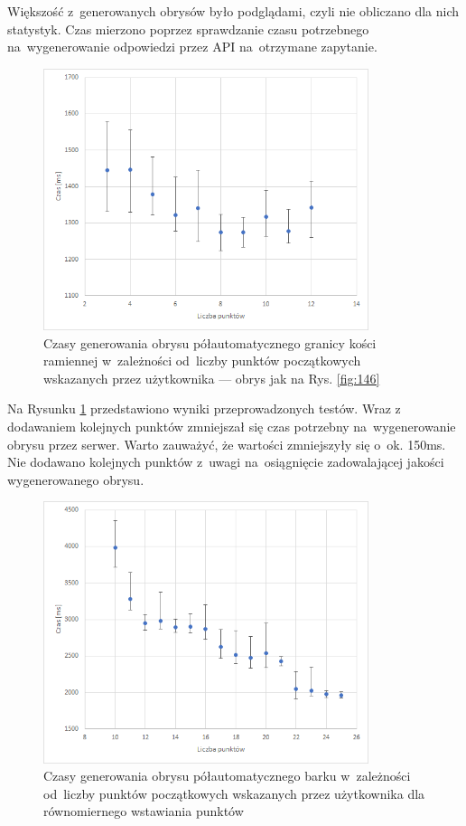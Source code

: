 \documentclass[a4paper,11pt,twoside,openright]{report}
\theoremstyle{definition}
\begin{document}
Większość z~generowanych obrysów było podglądami, czyli nie obliczano dla nich
statystyk. Czas mierzono poprzez sprawdzanie czasu potrzebnego na~wygenerowanie
odpowiedzi przez API na~otrzymane zapytanie.

\begin{figure}[h!]
	\center
	\includegraphics[width=0.85\textwidth]{152}
	\caption{Czasy generowania obrysu półautomatycznego granicy kości ramiennej
	 w~zależności od~liczby punktów
	początkowych wskazanych przez użytkownika --- obrys jak na Rys. \ref{fig:146}}
    	\label{fig:testy_1}
\end{figure}

Na Rysunku \ref{fig:testy_1} przedstawiono wyniki przeprowadzonych testów. Wraz
z dodawaniem kolejnych punktów zmniejszał się czas potrzebny na~wygenerowanie
obrysu przez serwer. Warto zauważyć, że wartości zmniejszyły się o~ok. 150ms.
Nie dodawano kolejnych punktów z~uwagi na~osiągnięcie zadowalającej jakości
wygenerowanego obrysu.

\begin{figure}[h!]
	\center
	\includegraphics[width=0.85\textwidth]{151}
	\caption{Czasy generowania obrysu półautomatycznego barku w~zależności od~liczby punktów
	początkowych wskazanych przez użytkownika dla równomiernego wstawiania punktów
	}
    	\label{fig:testy_2}
\end{figure}
\end{document}
